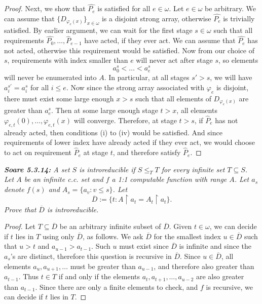 \documentclass{article}
\begin{document}
\begin{proof}
    Next, we show that $\hat{P_e}$ is satisfied for all $e\in\omega$. Let
    $e\in\omega$ be arbitrary. We can assume that
    $\{D_{\varphi_e(x)}\}_{x\in\omega}$ is a disjoint strong array,
    otherwise $\hat{P_e}$ is trivially satisfied. By earlier argument, we
    can wait for the first stage $s\in\omega$ such that all requirements
    $\hat{P_0},\ldots,\hat{P}_{e-1}$ have acted, if they ever act. We can
    assume that $\hat{P_e}$ has not acted, otherwise this requirement would
    be satisfied. Now from our choice of $s$, requirements with index
    smaller than $e$ will never act after stage $s$, so elements
    \[a_0^s<\ldots<a_e^s\] will never be enumerated into $A$. In
    particular, at all stages $s'>s$, we will have $a_i^{s'}=a_i^s$ for all
    $i\leq e$. Now since the strong array associated with $\varphi_e$ is
    disjoint, there must exist some large enough $x>s$ such that all
    elements of $D_{\varphi_e(x)}$ are greater than $a_e^s$. Then at some
    large enough stage $t>x$, all elements
    $\varphi_{e,t}(0),\ldots,\varphi_{e,t}(x)$ will converge.
    Therefore, at stage $t>s$, if $\hat{P}_e$ has not already acted, then
    conditions (i) to (iv) would be satisfied. And since requirements of
    lower index have already acted if they ever act, we would choose to
    act on requirement $\hat{P}_e$ at stage $t$, and therefore satisfy
    $\hat{P}_e$.
  \end{proof}

\it \textbf{Soare 5.3.14:} A set $S$ is introreducible if $S\leq_T T$ for
  every infinite set $T\subseteq S$. Let $A$ be an infinite c.c. set and
  $f$ a 1:1 computable function with range $A$. Let $a_s$ denote $f(s)$ and
  $A_s=\{a_v:v\leq s\}$. Let
  \[\overline{D} :=\{t: A\restriction a_t =A_t\restriction a_t\}.\]
  Prove that $\overline{D}$ is introreducible.

  \begin{proof}
    Let $T\subseteq\overline{D}$ be an arbitrary infinite subset of
    $\overline{D}$. Given $t\in\omega$, we can decide if $t$ lies in $T$
    using only $\overline{D}$, as follows. We ask $\overline{D}$ for the
    smallest index $u\in\overline{D}$ such that $u>t$ and
    $a_{u-1}>a_{t-1}$. Such $u$ must exist since $\overline{D}$ is infinite
    and since the $a_s$'s are distinct, therefore this question is
    recursive in $\overline{D}$. Since $u\in\overline{D}$, all elements
    $a_u,a_{u+1},\ldots$ must be greater than $a_{u-1}$, and therefore also
    greater than $a_{t-1}$. Thus $t\in T$ if and only if the elements
    $a_t,a_{t+1},\ldots,a_{u-2}$ are also greater than $a_{t-1}$.  Since
    there are only a finite elements to check, and $f$ is recursive, we can
    decide if $t$ lies in $T$.
  \end{proof}
\end{document}
